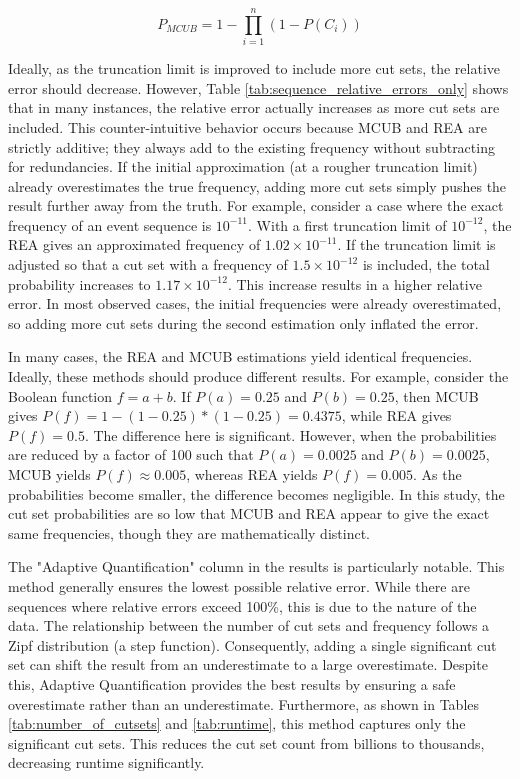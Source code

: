 \begin{equation}
    P_{MCUB} = 1 - \prod_{i=1}^{n} (1 - P(C_i))
\end{equation}

Ideally, as the truncation limit is improved to include more cut sets, the relative error should decrease. However, Table \ref{tab:sequence_relative_errors_only} shows that in many instances, the relative error actually increases as more cut sets are included. This counter-intuitive behavior occurs because MCUB and REA are strictly additive; they always add to the existing frequency without subtracting for redundancies. If the initial approximation (at a rougher truncation limit) already overestimates the true frequency, adding more cut sets simply pushes the result further away from the truth. For example, consider a case where the exact frequency of an event sequence is $10^{-11}$. With a first truncation limit of $10^{-12}$, the REA gives an approximated frequency of $1.02 \times 10^{-11}$. If the truncation limit is adjusted so that a cut set with a frequency of $1.5 \times 10^{-12}$ is included, the total probability increases to $1.17 \times 10^{-12}$. This increase results in a higher relative error. In most observed cases, the initial frequencies were already overestimated, so adding more cut sets during the second estimation only inflated the error.

In many cases, the REA and MCUB estimations yield identical frequencies. Ideally, these methods should produce different results. For example, consider the Boolean function $f = a + b$. If $P(a)=0.25$ and $P(b)=0.25$, then MCUB gives $P(f) = 1 - (1-0.25)*(1-0.25) = 0.4375$, while REA gives $P(f) = 0.5$. The difference here is significant. However, when the probabilities are reduced by a factor of 100 such that $P(a) = 0.0025$ and $P(b) = 0.0025$, MCUB yields $P(f) \approx 0.005$, whereas REA yields $P(f) = 0.005$. As the probabilities become smaller, the difference becomes negligible. In this study, the cut set probabilities are so low that MCUB and REA appear to give the exact same frequencies, though they are mathematically distinct.

The "Adaptive Quantification" column in the results is particularly notable. This method generally ensures the lowest possible relative error. While there are sequences where relative errors exceed 100\%, this is due to the nature of the data. The relationship between the number of cut sets and frequency follows a Zipf distribution (a step function). Consequently, adding a single significant cut set can shift the result from an underestimate to a large overestimate. Despite this, Adaptive Quantification provides the best results by ensuring a safe overestimate rather than an underestimate. Furthermore, as shown in Tables \ref{tab:number_of_cutsets} and \ref{tab:runtime}, this method captures only the significant cut sets. This reduces the cut set count from billions to thousands, decreasing runtime significantly.

